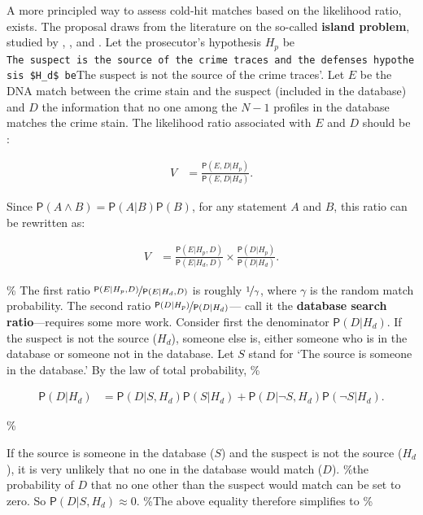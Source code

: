 \documentclass[10pt,dvipsnames,enabledeprecatedfontcommands]{scrartcl}
\newcommand{\pr}[1]{\mathsf{P}(#1)}
\begin{document}
A more principled way to assess cold-hit matches based on the likelihood
ratio, exists. The proposal draws from the literature on the so-called
\textbf{island problem}, studied by \citet{eggleston1978evidence},
\citet{dawid1994island}, and \citet{dawid1996CoherentAnalysisForensic}.
Let the prosecutor's hypothesis \(H_p\) be
\texttt{The\ suspect\ is\ the\ source\ of\ the\ crime\ traces\textquotesingle{}\ and\ the\ defense\textquotesingle{}s\ hypothesis\ \$H\_d\$\ be}The
suspect is not the source of the crime traces'. Let \(E\) be the DNA
match between the crime stain and the suspect (included in the database)
and \(D\) the information that no one among the \(N-1\) profiles in the
database matches the crime stain. The likelihood ratio associated with
\(E\) and \(D\) should be
\citep{balding1996EvaluatingDNAProfilea, taroni2006bayesian}:

\begin{align*}
V & = \frac{\pr{E,D\vert H_p}}{\pr{E,D\vert H_d}}.
\end{align*}

Since \(\pr{A\wedge B}=\pr{A\vert B}\pr{B}\), for any statement \(A\)
and \(B\), this ratio can be rewritten as:

\begin{align*}
V & = \frac{\pr{E\vert H_p,D}}{\pr{E\vert H_d,D}} \times \frac{\pr{D\vert H_p}}{\pr{D\vert H_d}}.
\end{align*}

\% The first ratio \(\nicefrac{\pr{E\vert H_p,D}}{\pr{E\vert H_d,D}}\)
is roughly \(\nicefrac{1}{\gamma}\), where \(\gamma\) is the random
match probability. The second ratio
\(\nicefrac{\pr{D\vert H_p}}{\pr{D\vert H_d}}\)--- call it the
\textbf{database search ratio}---requires some more work. Consider first
the denominator \(\pr{D \vert H_d}\). If the suspect is not the source
(\(H_d\)), someone else is, either someone who is in the database or
someone not in the database. Let \(S\) stand for `The source is someone
in the database.' By the law of total probability, \%

\begin{align*}
\pr{D\vert H_d} & = \pr{D\vert S, H_d} \pr{S\vert H_d} + \pr{D\vert \neg S, H_d} \pr{\neg S \vert H_d}. 
\end{align*}

\%

If the source is someone in the database (\(S\)) and the suspect is not
the source (\(H_d\)), it is very unlikely that no one in the database
would match (\(D\)). \%the probability of \(D\) that no one other than
the suspect would match can be set to zero. So
\(\pr{D\vert S, H_d}\approx 0\). \%The above equality therefore
simplifies to \%
\end{document}
